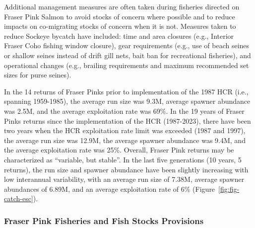 \documentclass[11pt]{book}
\begin{document}
Additional management measures are often taken during fisheries directed on Fraser Pink Salmon to avoid stocks of concern where possible and to reduce impacts on co-migrating stocks of concern when it is not. Measures taken to reduce Sockeye bycatch have included: time and area closures (e.g., Interior Fraser Coho fishing window closure), gear requirements (e.g., use of beach seines or shallow seines instead of drift gill nets, bait ban for recreational fisheries), and operational changes (e.g., brailing requirements and maximum recommended set sizes for purse seines).

In the 14 returns of Fraser Pinks prior to implementation of the 1987 HCR (i.e., spanning 1959-1985), the average run size was 9.3M, average spawner abundance was 2.5M, and the average exploitation rate was 69\%. In the 19 years of Fraser Pinks returns since the implementation of the HCR (1987-2023), there have been two years when the HCR exploitation rate limit was exceeded (1987 and 1997), the average run size was 12.9M, the average spawner abundance was 9.4M, and the average exploitation rate was 25\%. Overall, Fraser Pink returns may be characterized as ``variable, but stable''. In the last five generations (10 years, 5 returns), the run size and spawner abundance have been slightly increasing with low interannual variability, with an average run size of 7.38M, average spawner abundances of 6.89M, and an average exploitation rate of 6\% (Figure~\ref{fig:fig-catch-esc}).

\hypertarget{fraser-pink-fisheries-and-fish-stocks-provisions}{%
\subsubsection{Fraser Pink Fisheries and Fish Stocks Provisions}\label{fraser-pink-fisheries-and-fish-stocks-provisions}}
\end{document}
